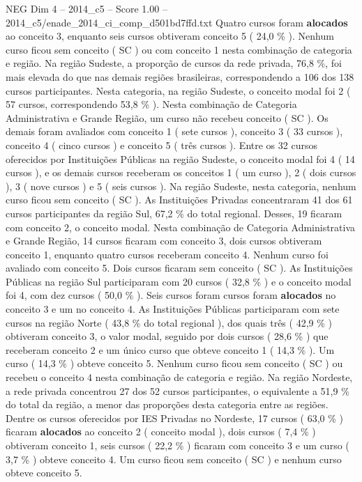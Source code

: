 \begin{textsample}{NEG Dim 4 – 2014\_c5 – Score 1.00 – 2014\_c5/enade\_2014\_ci\_comp\_d501bd7ffd.txt}
Quatro cursos foram \textbf{alocados} ao conceito 3, enquanto seis cursos obtiveram conceito 5 ( 24,0 \% ).
Nenhum curso ficou sem conceito ( SC ) ou com conceito 1 nesta combinação de categoria e região.
Na região Sudeste, a proporção de cursos da rede privada, 76,8 \%, foi mais elevada do que nas demais regiões brasileiras, correspondendo a 106 dos 138 cursos participantes.
Nesta categoria, na região Sudeste, o conceito modal foi 2 ( 57 cursos, correspondendo 53,8 \% ).
Nesta combinação de Categoria Administrativa e Grande Região, um curso não recebeu conceito ( SC ).
Os demais foram avaliados com conceito 1 ( sete cursos ), conceito 3 ( 33 cursos ), conceito 4 ( cinco cursos ) e conceito 5 ( três cursos ).
Entre os 32 cursos oferecidos por Instituições Públicas na região Sudeste, o conceito modal foi 4 ( 14 cursos ), e os demais cursos receberam os conceitos 1 ( um curso ), 2 ( dois cursos ), 3 ( nove cursos ) e 5 ( seis cursos ).
Na região Sudeste, nesta categoria, nenhum curso ficou sem conceito ( SC ).
As Instituições Privadas concentraram 41 dos 61 cursos participantes da região Sul, 67,2 \% do total regional.
Desses, 19 ficaram com conceito 2, o conceito modal.
Nesta combinação de Categoria Administrativa e Grande Região, 14 cursos ficaram com conceito 3, dois cursos obtiveram conceito 1, enquanto quatro cursos receberam conceito 4.
Nenhum curso foi avaliado com conceito 5.
Dois cursos ficaram sem conceito ( SC ).
As Instituições Públicas na região Sul participaram com 20 cursos ( 32,8 \% ) e o conceito modal foi 4, com dez cursos ( 50,0 \% ).
Seis cursos foram cursos foram \textbf{alocados} no conceito 3 e um no conceito 4.
As Instituições Públicas participaram com sete cursos na região Norte ( 43,8 \% do total regional ), dos quais três ( 42,9 \% ) obtiveram conceito 3, o valor modal, seguido por dois cursos ( 28,6 \% ) que receberam conceito 2 e um único curso que obteve conceito 1 ( 14,3 \% ).
Um curso ( 14,3 \% ) obteve conceito 5.
Nenhum curso ficou sem conceito ( SC ) ou recebeu o conceito 4 nesta combinação de categoria e região.
Na região Nordeste, a rede privada concentrou 27 dos 52 cursos participantes, o equivalente a 51,9 \% do total da região, a menor das proporções desta categoria entre as regiões.
Dentre os cursos oferecidos por IES Privadas no Nordeste, 17 cursos ( 63,0 \% ) ficaram \textbf{alocados} ao conceito 2 ( conceito modal ), dois cursos ( 7,4 \% ) obtiveram conceito 1, seis cursos ( 22,2 \% ) ficaram com conceito 3 e um curso ( 3,7 \% ) obteve conceito 4.
Um curso ficou sem conceito ( SC ) e nenhum curso obteve conceito 5.

\end{textsample}
